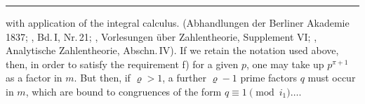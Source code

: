 \noindent\rule{4cm}{0.4pt}

\footnotesize
{} with application of the integral calculus. (Abhandlungen
der Berliner Akademie 1837; , Bd.\,I, Nr.\,21;
, Vorlesungen \"uber Zahlentheorie, Supplement VI;
, Analytische Zahlentheorie, Abschn.\,IV). If we retain the
notation used above, then, in order to satisfy the requirement f) for a
given $p$, one may take up $p^{\pi+1}$ as a factor in $m$. But then,
if $\varrho > 1$, a further $\varrho - 1$ prime factors
$q$ must occur in $m$, which are bound to congruences of the form $q \equiv 1
\pmod{i_1} \dots$.
\normalsize
